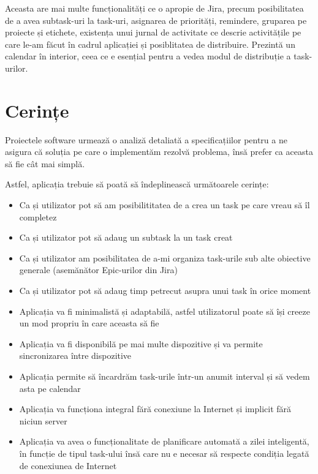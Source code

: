Aceasta are mai multe funcționalități ce o apropie de Jira, precum posibilitatea de a avea
subtask-uri la task-uri, asignarea de priorități, remindere, gruparea pe proiecte
și etichete, existența unui jurnal de activitate ce descrie activitățile pe care le-am făcut
în cadrul aplicației și posiblitatea de distribuire. Prezintă un calendar în interior,
ceea ce e esențial pentru a vedea modul de distribuție a task-urilor.

\section{Cerințe}

Proiectele software urmează o analiză detaliată a specificațiilor pentru a ne
asigura că soluția pe care o implementăm rezolvă problema, însă prefer ca aceasta
să fie cât mai simplă.

Astfel, aplicația trebuie să poată să îndeplinească următoarele cerințe:

\begin{itemize}
    \item Ca și utilizator pot să am posibilititatea de a crea un task pe care vreau să îl completez
    \item Ca și utilizator pot să adaug un subtask la un task creat
    \item Ca și utilizator am posibilitatea de a-mi organiza task-urile sub alte obiective
          generale (asemănător Epic-urilor din Jira)
    \item Ca și utilizator pot să adaug timp petrecut asupra unui task în orice moment
    \item Aplicația va fi minimalistă și adaptabilă, astfel utilizatorul poate să
          își creeze un mod propriu în care aceasta să fie
    \item Aplicația va fi disponibilă pe mai multe dispozitive și va permite sincronizarea
          între dispozitive
    \item Aplicația permite să încardrăm task-urile într-un anumit interval și să vedem asta pe calendar
    \item Aplicația va funcționa integral fără conexiune la Internet și implicit fără niciun server
    \item Aplicația va avea o funcționalitate de planificare automată a zilei inteligentă, în funcție de tipul task-ului însă
          care nu e necesar să respecte condiția legată de conexiunea de Internet
\end{itemize}
